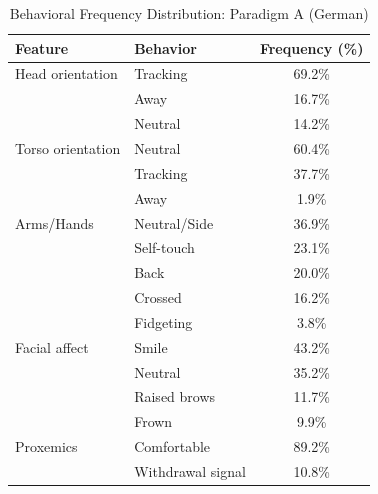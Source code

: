 \begin{table}[ht]
\centering
\caption{Behavioral Frequency Distribution: Paradigm A (German)}
\begin{tabular}{llc}
\toprule
Feature & Behavior & Frequency (\%) \\
\midrule
Head orientation & Tracking & 69.2\% \\
 & Away & 16.7\% \\
 & Neutral & 14.2\% \\
Torso orientation & Neutral & 60.4\% \\
 & Tracking & 37.7\% \\
 & Away & 1.9\% \\
Arms/Hands & Neutral/Side & 36.9\% \\
 & Self-touch & 23.1\% \\
 & Back & 20.0\% \\
 & Crossed & 16.2\% \\
 & Fidgeting & 3.8\% \\
Facial affect & Smile & 43.2\% \\
 & Neutral & 35.2\% \\
 & Raised brows & 11.7\% \\
 & Frown & 9.9\% \\
Proxemics & Comfortable & 89.2\% \\
 & Withdrawal signal & 10.8\% \\
\bottomrule
\end{tabular}
\end{table}